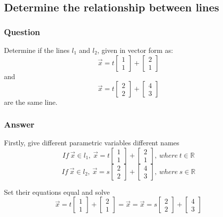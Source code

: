 \documentclass{article}
\begin{document}
\subsection{Determine the relationship between lines}
\subsubsection{Question}
Determine if the lines $l_1$ and $l_2$, given in vector form as: 
$$\overrightarrow{x} = t	\left[\begin{array}{c}
	1 \\
	1
	\end{array} \right ] + 	\left[\begin{array}{c}
	2 \\
	1 
	\end{array} \right ]
$$ and $$\overrightarrow{x} = t	\left[\begin{array}{c}
	2 \\
	2 
	\end{array} \right ] + 	\left[\begin{array}{c}
	4 \\
	3
	\end{array} \right ]
$$ are the same line.

\subsubsection{Answer}
Firstly, give different parametric variables different names
$$If\ \overrightarrow{x} \in l_1,\ \overrightarrow{x} = t \left[\begin{array}{c}
	1 \\
	1
	\end{array} \right ] + 	\left[\begin{array}{c}
	2 \\
	1 
	\end{array} \right ],\ where\ t \in \mathbb{R}$$
$$If\ \overrightarrow{x} \in l_2,\ \overrightarrow{x} = s \left[\begin{array}{c}
	2 \\
	2
	\end{array} \right ] + 	\left[\begin{array}{c}
	4 \\
	3 
	\end{array} \right ],\ where\ s \in \mathbb{R}$$

\noindent Set their equations equal and solve
$$\overrightarrow{x} = t \left[\begin{array}{c}
	1 \\
	1
	\end{array} \right ] + 	\left[\begin{array}{c}
	2 \\
	1 
	\end{array} \right ] = \overrightarrow{x} = \overrightarrow{x} = s \left[\begin{array}{c}
	2 \\
	2
	\end{array} \right ] + 	\left[\begin{array}{c}
	4 \\
	3 
	\end{array} \right ]$$
\end{document}
